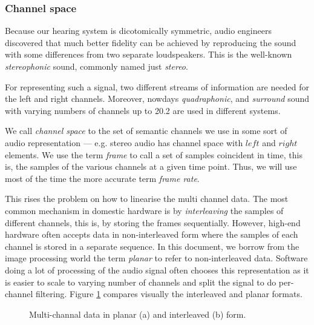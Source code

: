 \subsubsection{Channel space}

Because our hearing system is dicotomically symmetric, audio
engineers discovered that much better fidelity can be achieved by
reproducing the sound with some differences from two separate
loudspeakers. This is the well-known \emph{stereophonic} sound,
commonly named just \emph{stereo}.

For representing such a signal, two different streams of information
are needed for the left and right channels. Moreover, nowdays
\emph{quadraphonic}, and \emph{surround} sound with varying numbers of
channels up to 20.2 are used in different systems.

We call \emph{channel space} to the set of semantic channels we use in
some sort of audio representation --- e.g. stereo audio has channel
space with $left$ and $right$ elements. We use the term
\emph{frame} to call a set of samples coincident in time, this is, the
samples of the various channels at a given time point. Thus, we will
use most of the time the more accurate term \emph{frame rate}.

This rises the problem on how to linearise the multi channel data. The
most common mechanism in domestic hardware is by \emph{interleaving}
the samples of different channels, this is, by storing the frames
sequentially. However, high-end hardware often accepts data in
non-interleaved form where the samples of each channel is stored in a
separate sequence. In this document, we borrow from the image
processing world the term \emph{planar} to refer to non-interleaved
data. Software doing a lot of processing of the audio signal often
chooses this representation as it is easier to scale to varying number
of channels and split the signal to do per-channel filtering. Figure
\ref{fig:interleaving} compares visually the interleaved and planar
formats.

\begin{figure}[h]
  \centering
  \;
  \caption{Multi-channal data in planar (a) and interleaved (b) form.}
  \label{fig:interleaving}
\end{figure}


